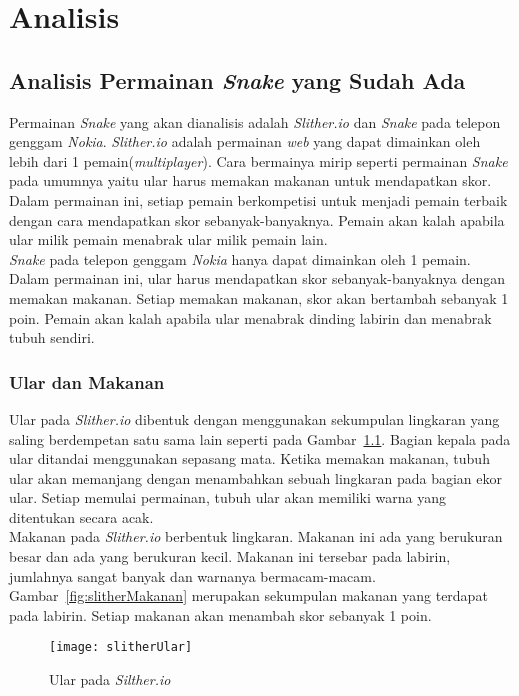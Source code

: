 \chapter{Analisis}
\label{chap:analisis}

\section{Analisis Permainan \textit{Snake} yang Sudah Ada}
Permainan \textit{Snake} yang akan dianalisis adalah \textit{Slither.io} dan \textit{Snake} pada telepon genggam \textit{Nokia}. \textit{Slither.io} adalah permainan \textit{web} yang dapat dimainkan oleh lebih dari 1 pemain(\textit{multiplayer}). Cara bermainya mirip seperti permainan \textit{Snake} pada umumnya yaitu ular harus memakan makanan untuk mendapatkan skor. Dalam permainan ini, setiap pemain berkompetisi untuk menjadi pemain terbaik dengan cara mendapatkan skor sebanyak-banyaknya. Pemain akan kalah apabila ular milik pemain menabrak ular milik pemain lain.\\

\textit{Snake} pada telepon genggam \textit{Nokia} hanya dapat dimainkan oleh 1 pemain. Dalam permainan ini, ular harus mendapatkan skor sebanyak-banyaknya dengan memakan makanan. Setiap memakan makanan, skor akan bertambah sebanyak 1 poin. Pemain akan kalah apabila ular menabrak dinding labirin dan menabrak tubuh sendiri.

\subsection{Ular dan Makanan}
Ular pada \textit{Slither.io} dibentuk dengan menggunakan sekumpulan lingkaran yang saling berdempetan satu sama lain seperti pada Gambar~\ref{fig:slitherUlar}. Bagian kepala pada ular ditandai menggunakan sepasang mata. Ketika memakan makanan, tubuh ular akan memanjang dengan menambahkan sebuah lingkaran pada bagian ekor ular. Setiap memulai permainan, tubuh ular akan memiliki warna yang ditentukan secara acak.\\

Makanan pada \textit{Slither.io} berbentuk lingkaran. Makanan ini ada yang berukuran besar dan ada yang berukuran kecil. Makanan ini tersebar pada labirin, jumlahnya sangat banyak dan warnanya bermacam-macam. Gambar~\ref{fig:slitherMakanan} merupakan sekumpulan makanan yang terdapat pada labirin. Setiap makanan akan menambah skor sebanyak 1 poin.

\begin{figure}[H]
	\centering  
	\texttt{[image: slitherUlar]}  
	\caption[Ular pada \textit{Silther.io}]{Ular pada \textit{Silther.io}}
	\label{fig:slitherUlar} 
\end{figure}

